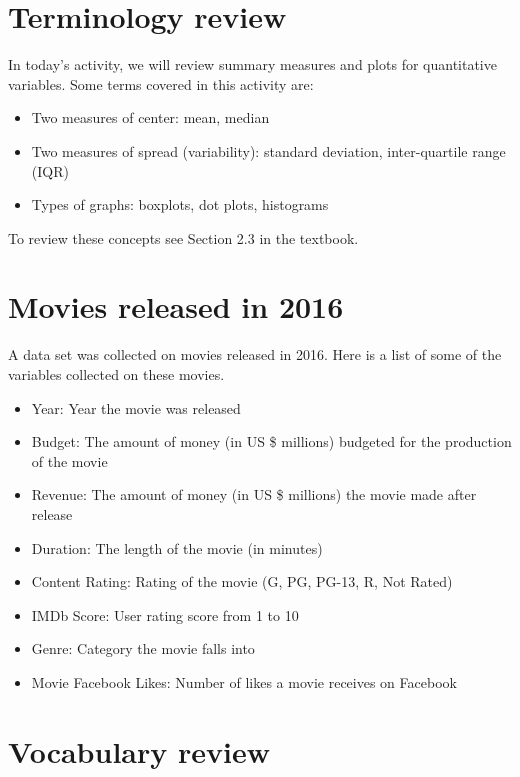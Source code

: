 \documentclass[
]{report}
\begin{document}
\hypertarget{terminology-review}{%
\section{Terminology review}\label{terminology-review}}

In today's activity, we will review summary measures and plots for quantitative variables. Some terms covered in this activity are:

\begin{itemize}
\item
  Two measures of center: mean, median
\item
  Two measures of spread (variability): standard deviation, inter-quartile range (IQR)
\item
  Types of graphs: boxplots, dot plots, histograms
\end{itemize}

To review these concepts see Section 2.3 in the textbook.

\hypertarget{movies-released-in-2016}{%
\section{Movies released in 2016}\label{movies-released-in-2016}}

A data set was collected on movies released in 2016. Here is a list of some of the variables collected on these movies.

\begin{itemize}
\item
  Year: Year the movie was released
\item
  Budget: The amount of money (in US \$ millions) budgeted for the production of the movie
\item
  Revenue: The amount of money (in US \$ millions) the movie made after release
\item
  Duration: The length of the movie (in minutes)
\item
  Content Rating: Rating of the movie (G, PG, PG-13, R, Not Rated)
\item
  IMDb Score: User rating score from 1 to 10
\item
  Genre: Category the movie falls into
\item
  Movie Facebook Likes: Number of likes a movie receives on Facebook
\end{itemize}

\newpage

\hypertarget{vocabulary-review}{%
\section{Vocabulary review}\label{vocabulary-review}}
\end{document}

